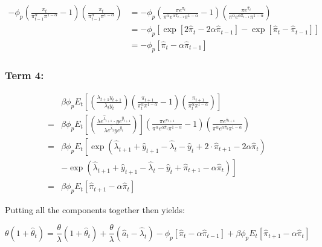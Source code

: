 \documentclass[11pt,preprint, authoryear]{elsarticle}
\numberwithin{equation}{section}
\numberwithin{figure}{section}
\numberwithin{table}{section}
\begin{document}
\[\begin{aligned}
-\phi_{p}\left(\frac{\pi_{t}}{\pi_{t-1}^{\alpha} \pi^{1-\alpha}}-1\right)\left(\frac{\pi_{t}}{\pi_{t-1}^{\alpha} \pi^{1-\alpha}}\right) &= -\phi_{p}\left(\frac{\pi e^{\pi_{t}}}{\pi^{\alpha} e^{\alpha \hat{\pi}_{t-1}} \pi^{1-\alpha}}-1\right)\left(\frac{\pi e^{\hat{\pi}_t}}{\pi^{\alpha} e^{\alpha \hat{\pi}_{t-1}} \pi^{1-\alpha}}\right)\\
&= -\phi_p\left[\exp \left[2 \hat{\pi}_{t}-2 \alpha \hat{\pi}_{t-1}\right]-\exp \left[\hat{\pi}_{t}-\hat{\pi}_{t-1}\right]\right]\\
&=-\phi_p\left[\hat{\pi}_{t}-\alpha \hat{\pi}_{t-1}\right]
 \end{aligned}\]

\hypertarget{term-4}{%
\subsubsection{Term 4:}\label{term-4}}

\[\begin{aligned}
&\beta \phi_{p} E_{t}\left[\left(\frac{\lambda_{t+1} y_{t+1}}{\lambda_{t} y_{t}}\right)\left(\frac{\pi_{t+1}}{\pi_{t}^{\alpha} \pi^{1-\alpha}}-1\right)\left(\frac{\pi_{t+1}}{\pi_{t}^{\alpha} \pi^{1-\alpha}}\right)\right] \\
=& \beta \phi_{p} E_{t}\left[\left(\frac{\lambda e^{\hat{\lambda}_{t+1}} \cdot y e^{\hat{y}_{t+1}}}{\lambda e^{\hat{\lambda}_t} y e^{\hat{y}_t}}\right)\right]\left(\frac{\pi e^{\pi_{t+1}}}{\pi^{\alpha} e^{\alpha \hat{\pi}_{t}} \pi^{1-\alpha}}-1\right)\left(\frac{\pi e^{\hat{\pi}_{t+1}}}{\pi^{\alpha} e^{\alpha \hat{\pi}_{t}} \pi^{1-\alpha}}\right)\\
=& \beta \phi_{p} E_{t}\left[\exp \left(\hat{\lambda}_{t+1}+\hat{y}_{t+1}-\hat{\lambda}_{t}-\hat{y}_{t}+2 \cdot \hat{\pi}_{t+1}-2 \alpha \hat{\pi}_{t}\right)\right.\\
&\left.-\exp \left(\hat{\lambda}_{t+1}+\hat{y}_{t+1}-\hat{\lambda}_{t}-\hat{y}_{t}+\hat{\pi}_{t+1}-\alpha \hat{\pi}_{t}\right)\right] \\
=& \beta \phi_{p} E_{t}\left[ \hat{\pi}_{t+1}-\alpha \hat{\pi}_{t}\right]
\end{aligned}\]

Putting all the components together then yields:

\[ \theta\left(1+\hat{\theta}_{t}\right)=\frac{\theta}{\lambda}\left(1+\hat{\theta}_{t} \right)+ \frac{\theta}{\lambda} \left(\hat{a}_{t}-\hat{\lambda}_{t}\right) - \phi_p\left[\hat{\pi}_{t}-\alpha \hat{\pi}_{t-1}\right] + \beta \phi_{p} E_{t}\left[ \hat{\pi}_{t+1}-\alpha \hat{\pi}_{t}\right] \]
\end{document}
